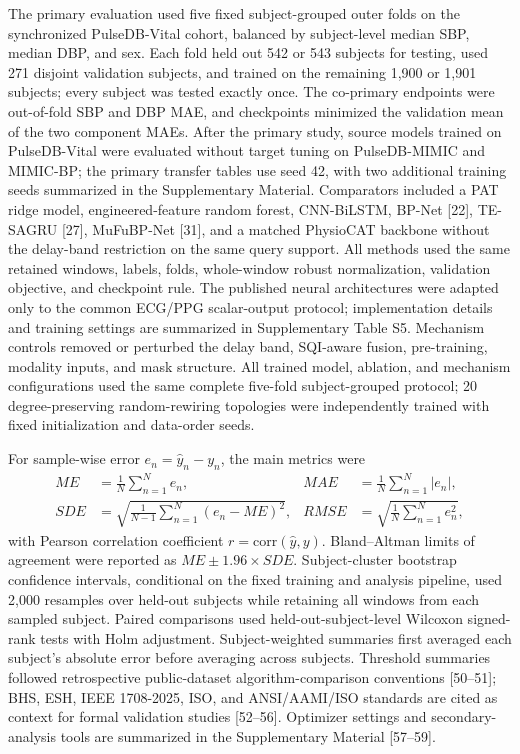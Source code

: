 \documentclass[preprint,12pt]{elsarticle}
\begin{document}
The primary evaluation used five fixed subject-grouped outer folds on the synchronized PulseDB-Vital cohort, balanced by subject-level median SBP, median DBP, and sex. Each fold held out 542 or 543 subjects for testing, used 271 disjoint validation subjects, and trained on the remaining 1{,}900 or 1{,}901 subjects; every subject was tested exactly once. The co-primary endpoints were out-of-fold SBP and DBP MAE, and checkpoints minimized the validation mean of the two component MAEs. After the primary study, source models trained on PulseDB-Vital were evaluated without target tuning on PulseDB-MIMIC and MIMIC-BP; the primary transfer tables use seed 42, with two additional training seeds summarized in the Supplementary Material. Comparators included a PAT ridge model, engineered-feature random forest, CNN-BiLSTM, BP-Net [22], TE-SAGRU [27], MuFuBP-Net [31], and a matched PhysioCAT backbone without the delay-band restriction on the same query support. All methods used the same retained windows, labels, folds, whole-window robust normalization, validation objective, and checkpoint rule. The published neural architectures were adapted only to the common ECG/PPG scalar-output protocol; implementation details and training settings are summarized in Supplementary Table S5. Mechanism controls removed or perturbed the delay band, SQI-aware fusion, pre-training, modality inputs, and mask structure. All trained model, ablation, and mechanism configurations used the same complete five-fold subject-grouped protocol; 20 degree-preserving random-rewiring topologies were independently trained with fixed initialization and data-order seeds.

For sample-wise error $e_n=\hat{y}_n-y_n$, the main metrics were
\begin{align}
ME &= \frac{1}{N}\sum_{n=1}^{N} e_n, &
MAE &= \frac{1}{N}\sum_{n=1}^{N} |e_n|, \\
SDE &= \sqrt{\frac{1}{N-1}\sum_{n=1}^{N}(e_n-ME)^2}, &
RMSE &= \sqrt{\frac{1}{N}\sum_{n=1}^{N} e_n^2},
\end{align}
with Pearson correlation coefficient $r=\mathrm{corr}(\hat{y},y)$. Bland--Altman limits of agreement were reported as $ME \pm 1.96\times SDE$. Subject-cluster bootstrap confidence intervals, conditional on the fixed training and analysis pipeline, used 2{,}000 resamples over held-out subjects while retaining all windows from each sampled subject. Paired comparisons used held-out-subject-level Wilcoxon signed-rank tests with Holm adjustment. Subject-weighted summaries first averaged each subject's absolute error before averaging across subjects. Threshold summaries followed retrospective public-dataset algorithm-comparison conventions [50--51]; BHS, ESH, IEEE 1708-2025, ISO, and ANSI/AAMI/ISO standards are cited as context for formal validation studies [52--56]. Optimizer settings and secondary-analysis tools are summarized in the Supplementary Material [57--59].
\end{document}
